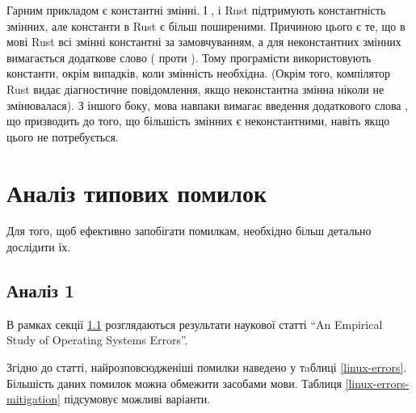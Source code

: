 \documentclass[main.tex]{subfiles}
\begin{document}
Гарним прикладом є константні змінні. І \LangC{}, і Rust підтримують константність змінних, але константи в Rust є більш поширеними. Причиною цього є те, що в мові Rust всі змінні константні за замовчуванням, а для неконстантних змінних вимагається додаткове слово ( проти ). Тому програмісти використовують константи, окрім випадків, коли змінність необхідна. (Окрім того, компілятор Rust видає діагностичне повідомлення, якщо неконстантна змінна ніколи не змінювалася). З іншого боку, мова \LangC{} навпаки вимагає введення додаткового слова , що призводить до того, що більшість змінних є неконстантними, навіть якщо цього не потребується.


\section{Аналіз типових помилок}
Для того, щоб ефективно запобігати помилкам, необхідно більш детально дослідити їх.

\subsection{Аналіз 1}\label{errors:os}
В рамках секції \ref{errors:os} розглядаються результати наукової статті ``An Empirical Study of Operating Systems Errors''\cite{an-empirical-study-of-operating-systems-errors}.

Згідно до статті, найрозповсюдженіші помилки наведено у тaблиці \ref{linux-errors}.
Більшість даних помилок можна обмежити засобами мови. Таблиця \ref{linux-errors-mitigation} підсумовує можливі варіанти.
\end{document}
